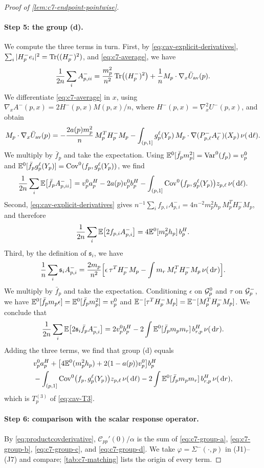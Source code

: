 \begin{proof}[Proof of \cref{lem:c7-endpoint-pointwise}]
\paragraph{Step 5: the group (d).}
We compute the three terms in turn. First, by
\eqref{eq:cav-explicit-derivatives},
$\sum_i|H_p^-e_i|^2=\operatorname{Tr}((H_p^-)^2)$, and \eqref{eq:c7-average}, we have
\[
 \frac1{2n}\sum_iA_{p,ii}^-
 =\frac{m_p^2}{n^2}\operatorname{Tr}\bigl((H_p^-)^2\bigr)
 +\frac1nM_p\cdot\nabla_x\ddot U_{\rm av}(p).
\]
We differentiate \eqref{eq:c7-average} in $x$, using
$\nabla_xA^-(p,x)=2H^-(p,x)M(p,x)/n$, where
$H^-(p,x)=\nabla_x^2U^-(p,x)$, and obtain
\[
 M_p\cdot\nabla_x\ddot U_{\rm av}(p)
 =-\frac{2a(p)m_p^2}n\,M_p^TH_p^-M_p
 -\int_{(p,1]}g_p^\ell(Y_p)\,M_p\cdot\nabla(P^-_{p,\ell}A_\ell^-)(X_p)
 \,\nu(\,\mathrm d\ell).
\]
We multiply by $\bar f_p$ and take the expectation. Using
$\mathbb E^0[\bar f_pm_p^2]=\operatorname{Var}^0(f_p)=v_p^0$ and
$\mathbb E^0[\bar f_pg_p^\ell(Y_p)]=\operatorname{Cov}^0(f_p,g_p^\ell(Y_p))$, we find
\[
 \frac1{2n}\sum_i\mathbb E\bigl[\bar f_pA_{p,ii}^-\bigr]
 =v_p^0a_p^H-2a(p)v_p^0b_p^H
 -\int_{(p,1]}\operatorname{Cov}^0\bigl(f_p,g_p^\ell(Y_p)\bigr)z_{p,\ell}\,\nu(\,\mathrm d\ell).
\]
Second, \eqref{eq:cav-explicit-derivatives} gives
$n^{-1}\sum_if_{p,i}A_{p,i}^-=4n^{-2}m_p^2h_p\,M_p^TH_p^-M_p$, and
therefore
\[
 \frac1{2n}\sum_i\mathbb E\bigl[2f_{p,i}A_{p,i}^-\bigr]
 =4\mathbb E^0[m_p^2h_p]\,b_p^H.
\]
Third, by the definition of $\mathfrak s_i$, we have
\[
 \frac1n\sum_i\mathfrak s_iA_{p,i}^-
 =\frac{2m_p}{n^2}\Bigl[\epsilon\,\tau^TH_p^-M_p
 -\int m_r\,M_r^TH_p^-M_p\,\nu(\,\mathrm d r)\Bigr].
\]
We multiply by $\bar f_p$ and take the expectation. Conditioning
$\epsilon$ on $\mathcal G^0_p$ and $\tau$ on $\mathcal G^-_p$, we have
$\mathbb E^0[\bar f_pm_p\epsilon]=\mathbb E^0[\bar f_pm_p^2]=v_p^0$ and
$\mathbb E^-[\tau^TH_p^-M_p]=\mathbb E^-[M_p^TH_p^-M_p]$. We conclude that
\[
 \frac1{2n}\sum_i\mathbb E\bigl[2\mathfrak s_i\bar f_pA_{p,i}^-\bigr]
 =2v_p^0b_p^H-2\int\mathbb E^0[\bar f_pm_pm_r]\,b_{r,p}^H\,\nu(\,\mathrm d r).
\]
Adding the three terms, we find that group (d) equals
\begin{equation}\label{eq:c7-group-d}
 \begin{aligned}
 &v_p^0a_p^H+\bigl[4\mathbb E^0(m_p^2h_p)+2(1-a(p))v_p^0\bigr]b_p^H\\
 &-\int_{(p,1]}\operatorname{Cov}^0\bigl(f_p,g_p^\ell(Y_p)\bigr)z_{p,\ell}\,\nu(\,\mathrm d\ell)
 -2\int\mathbb E^0[\bar f_pm_pm_r]\,b_{r,p}^H\,\nu(\,\mathrm d r),
 \end{aligned}
\end{equation}
which is $T_p^{(3)}$ of \eqref{eq:cav-T3}.

\paragraph{Step 6: comparison with the scalar response operator.}
By \eqref{eq:productcovderivative}, $\mathcal C_{pp}'(0)/\alpha$ is the
sum of \eqref{eq:c7-group-a}, \eqref{eq:c7-group-b},
\eqref{eq:c7-group-c}, and \eqref{eq:c7-group-d}. We take
$\varphi=\Sigma^-(\cdot,p)$ in (J1)--(J7) and compare;
\cref{tab:c7-matching} lists the origin of every term.


\end{proof}

